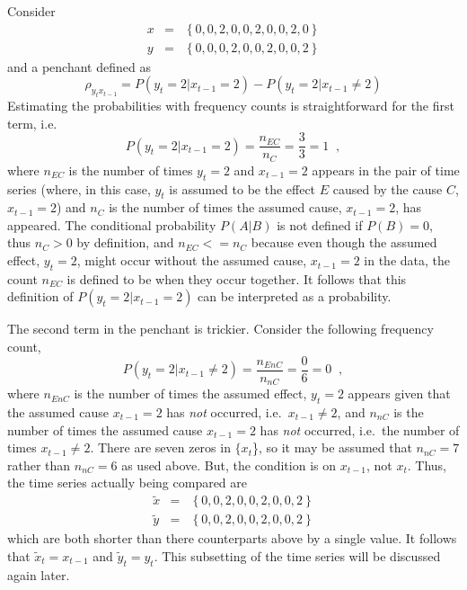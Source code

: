 \documentclass[a4paper,11pt]{article}
\begin{document}
Consider
\begin{eqnarray*}
x &=& \left\{0,0,2,0,0,2,0,0,2,0\right\}\\
y &=& \left\{0,0,0,2,0,0,2,0,0,2\right\}
\end{eqnarray*}
and a penchant defined as
$$
\rho_{y_{t}x_{t-1}} = P\left( y_t = 2 | x_{t-1} = 2\right) - P\left( y_t = 2 | x_{t-1} \neq 2\right)
$$
Estimating the probabilities with frequency counts is straightforward for the first term, i.e.\
$$
P\left( y_t = 2 | x_{t-1} = 2\right) = \frac{n_{EC}}{n_C} = \frac{3}{3} = 1\;\;,
$$
where $n_{EC}$ is the number of times $y_t=2$ and $x_{t-1}=2$ appears in the pair of time series (where, in this case, $y_t$ is assumed to be the effect $E$ caused by the cause $C$, $x_{t-1}=2$) and $n_{C}$ is the number of times the assumed cause, $x_{t-1}=2$, has appeared.  The conditional probability $P(A|B)$ is not defined if $P(B) = 0$, thus $n_C >0$ by definition, and $n_{EC}<=n_C$ because even though the assumed effect, $y_t=2$, might occur without the assumed cause, $x_{t-1}=2$ in the data, the count $n_{EC}$ is defined to be when they occur together.  It follows that this definition of $P\left( y_t = 2 | x_{t-1} = 2\right)$ can be interpreted as a probability.  

The second term in the penchant is trickier.  Consider the following frequency count,
$$
P\left( y_t = 2 | x_{t-1} \neq 2\right) = \frac{n_{EnC}}{n_{nC}} = \frac{0}{6} = 0\;\;,
$$
where $n_{EnC}$ is the number of times the assumed effect, $y_t=2$ appears given that the assumed cause $x_{t-1}=2$ has {\em not} occurred, i.e.\ $x_{t-1}\neq 2$, and $n_{nC}$ is the number of times the assumed cause $x_{t-1}=2$ has {\em not} occurred, i.e.\ the number of times $x_{t-1}\neq 2$.  There are seven zeros in $\{x_t$\}, so it may be assumed that $n_{nC}=7$ rather than $n_{nC}=6$ as used above.  But, the condition is on $x_{t-1}$, not $x_t$.  Thus, the time series actually being compared are
\begin{eqnarray*}
\tilde{x} &=& \left\{0,0,2,0,0,2,0,0,2\right\}\\
\tilde{y} &=& \left\{0,0,2,0,0,2,0,0,2\right\}
\end{eqnarray*}
which are both shorter than there counterparts above by a single value.  It follows that $\tilde{x}_t = x_{t-1}$ and $\tilde{y}_t=y_t$.  This subsetting of the time series will be discussed again later.
\end{document}
